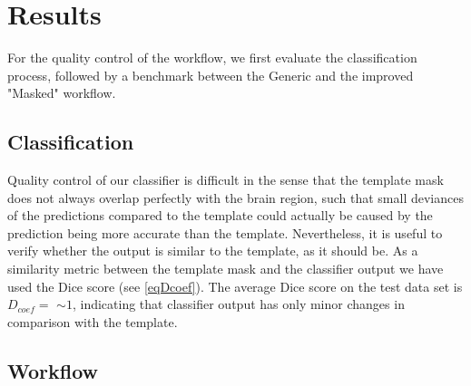 \section{Results}
For the quality control of the workflow, we first evaluate the classification process, followed by a benchmark between the Generic and the improved "Masked" workflow.

\subsection{Classification}
Quality control of our classifier is difficult in the sense that the template mask does not always overlap perfectly with the brain region, such that small deviances of the predictions compared to the template could actually be caused by the prediction being more accurate than the template.
Nevertheless, it is useful to verify whether the output is similar to the template, as it should be.
As a similarity metric between the template mask and the classifier output we have used the Dice score (see \cref{eqDcoef}).
The average Dice score on the test data set is $D_{coef}= $  $\sim 1$, indicating that classifier output has only minor changes in comparison with the template.

\begin{sansmath}
\end{sansmath}

\subsection{Workflow}
\begin{sansmath}
\end{sansmath}

